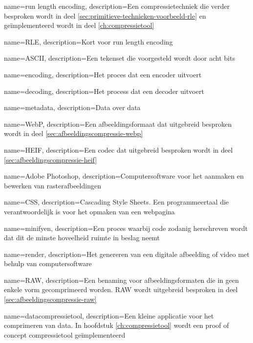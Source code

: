 {
	name={run length encoding},
	description={Een compressietechniek die verder besproken wordt in deel \ref{sec:primitieve-technieken-voorbeeld-rle} en geïmplementeerd wordt in deel \ref{ch:compressietool}}
}

{
	name={RLE},
	description={Kort voor run length encoding}
}

{
	name={ASCII},
	description={Een tekenset die voorgesteld wordt door acht bits}
}

{
	name={encoding},
	description={Het proces dat een encoder uitvoert}
}

{
	name={decoding},
	description={Het process dat een decoder uitvoert}
}

{
	name={metadata},
	description={Data over data}
}

{
	name={WebP},
	description={Een afbeeldingsformaat dat uitgebreid besproken wordt in deel \ref{sec:afbeeldingscompressie-webp}}
}

{
	name={HEIF},
	description={Een codec dat uitgebreid besproken wordt in deel \ref{sec:afbeeldingscompressie-heif}}
}

{
	name={Adobe Photoshop},
	description={Computersoftware voor het aanmaken en bewerken van rasterafbeeldingen}
}

{
	name={CSS},
	description={Cascading Style Sheets. Een programmeertaal die verantwoordelijk is voor het opmaken van een webpagina}
}

{
	name={minifyen},
	description={Een proces waarbij code zodanig herschreven wordt dat dit de minste hoveelheid ruimte in beslag neemt}
}

{
	name={render},
	description={Het genereren van een digitale afbeelding of video met behulp van computersoftware}
}

{
	name={RAW},
	description={Een benaming voor afbeeldingsformaten die in geen enkele vorm gecomprimeerd worden. RAW wordt uitgebreid besproken in deel \ref{sec:afbeeldingscompressie-raw}}
}

{
	name={datacompressietool},
	description={Een kleine applicatie voor het comprimeren van data. In hoofdstuk \ref{ch:compressietool} wordt een proof of concept compressietool geïmplementeerd}
}

